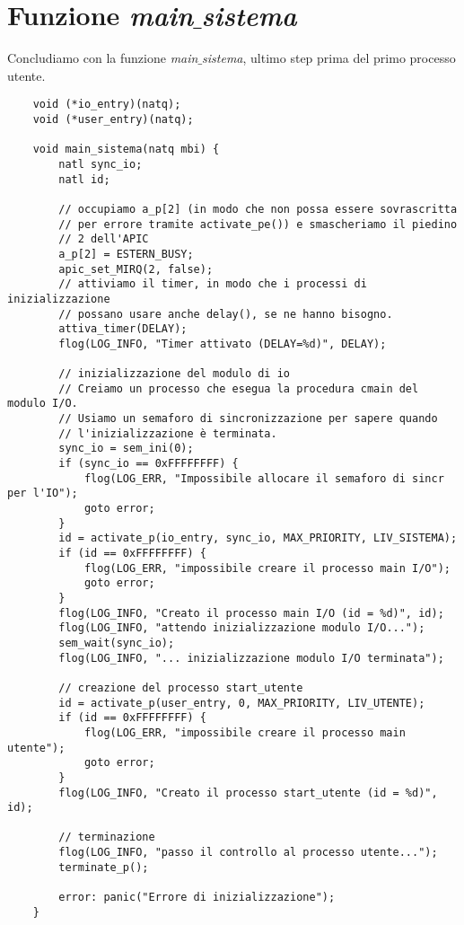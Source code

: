 \section{Funzione \emph{main$\_$sistema}}
Concludiamo con la funzione \emph{main$\_$sistema}, ultimo step prima del primo processo utente.
\small 
\begin{verbatim}
	void (*io_entry)(natq);
	void (*user_entry)(natq);
	
	void main_sistema(natq mbi) {
		natl sync_io;
		natl id;
		
		// occupiamo a_p[2] (in modo che non possa essere sovrascritta
		// per errore tramite activate_pe()) e smascheriamo il piedino
		// 2 dell'APIC
		a_p[2] = ESTERN_BUSY;
		apic_set_MIRQ(2, false);
		// attiviamo il timer, in modo che i processi di inizializzazione
		// possano usare anche delay(), se ne hanno bisogno.
		attiva_timer(DELAY);
		flog(LOG_INFO, "Timer attivato (DELAY=%d)", DELAY);
		
		// inizializzazione del modulo di io
		// Creiamo un processo che esegua la procedura cmain del modulo I/O.
		// Usiamo un semaforo di sincronizzazione per sapere quando
		// l'inizializzazione è terminata.
		sync_io = sem_ini(0);
		if (sync_io == 0xFFFFFFFF) {
			flog(LOG_ERR, "Impossibile allocare il semaforo di sincr per l'IO");
			goto error;
		}
		id = activate_p(io_entry, sync_io, MAX_PRIORITY, LIV_SISTEMA);
		if (id == 0xFFFFFFFF) {
			flog(LOG_ERR, "impossibile creare il processo main I/O");
			goto error;
		}
		flog(LOG_INFO, "Creato il processo main I/O (id = %d)", id);
		flog(LOG_INFO, "attendo inizializzazione modulo I/O...");
		sem_wait(sync_io);
		flog(LOG_INFO, "... inizializzazione modulo I/O terminata");
		
		// creazione del processo start_utente
		id = activate_p(user_entry, 0, MAX_PRIORITY, LIV_UTENTE);
		if (id == 0xFFFFFFFF) {
			flog(LOG_ERR, "impossibile creare il processo main utente");
			goto error;
		}
		flog(LOG_INFO, "Creato il processo start_utente (id = %d)", id);
		
		// terminazione
		flog(LOG_INFO, "passo il controllo al processo utente...");
		terminate_p();
		
		error: panic("Errore di inizializzazione");
	}
\end{verbatim}
\normalsize 
